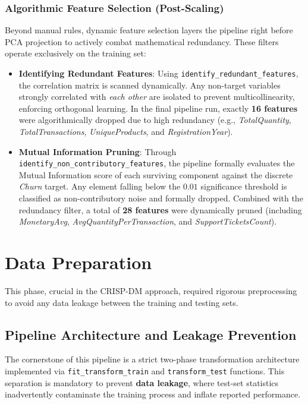 \documentclass[11pt,a4paper]{article}
\begin{document}
\subsubsection{Algorithmic Feature Selection (Post-Scaling)}
Beyond manual rules, dynamic feature selection layers the pipeline right before PCA projection to actively combat mathematical redundancy. These filters operate exclusively on the training set:

\begin{itemize}
    \item \textbf{Identifying Redundant Features}: Using \texttt{identify\_redundant\_features}, the correlation matrix is scanned dynamically. Any non-target variables strongly correlated with \textit{each other} are isolated to prevent multicollinearity, enforcing orthogonal learning. In the final pipeline run, exactly \textbf{16 features} were algorithmically dropped due to high redundancy (e.g., \textit{TotalQuantity}, \textit{TotalTransactions}, \textit{UniqueProducts}, and \textit{RegistrationYear}).
    \item \textbf{Mutual Information Pruning}: Through \texttt{identify\_non\_contributory\_features}, the pipeline formally evaluates the Mutual Information score of each surviving component against the discrete \textit{Churn} target. Any element falling below the $0.01$ significance threshold is classified as non-contributory noise and formally dropped. Combined with the redundancy filter, a total of \textbf{28 features} were dynamically pruned (including \textit{MonetaryAvg}, \textit{AvgQuantityPerTransaction}, and \textit{SupportTicketsCount}).
\end{itemize}

\section{Data Preparation}

This phase, crucial in the CRISP-DM approach, required rigorous preprocessing to avoid any data leakage between the training and testing sets.

\subsection{Pipeline Architecture and Leakage Prevention}
The cornerstone of this pipeline is a strict two-phase transformation architecture implemented via \texttt{fit\_transform\_train} and \texttt{transform\_test} functions. This separation is mandatory to prevent \textbf{data leakage}, where test-set statistics inadvertently contaminate the training process and inflate reported performance.
\end{document}
